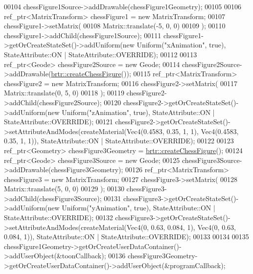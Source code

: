 \begin{DoxyCode}
00104         chessFigure1Source->addDrawable(chessFigure1Geometry);
00105 
00106         ref\_ptr<MatrixTransform> chessFigure1 = \textcolor{keyword}{new} MatrixTransform;
00107         chessFigure1->setMatrix(
00108             Matrix::translate(-5, 0, 0)
00109             );
00110         chessFigure1->addChild(chessFigure1Source);
00111         chessFigure1->getOrCreateStateSet()->addUniform(\textcolor{keyword}{new} Uniform(\textcolor{stringliteral}{"xAnimation"}, \textcolor{keyword}{true}), StateAttribute::ON
       | StateAttribute::OVERRIDE);
00112 
00113         ref\_ptr<Geode> chessFigure2Source = \textcolor{keyword}{new} Geode;
00114         chessFigure2Source->addDrawable(\hyperlink{namespacebrtr_a118d4013732dea1a161b6d225df6dc2e}{brtr::createChessFigure}());
00115         ref\_ptr<MatrixTransform> chessFigure2 = \textcolor{keyword}{new} MatrixTransform;
00116         chessFigure2->setMatrix(
00117             Matrix::translate(0, 5, 0)
00118             );
00119         chessFigure2->addChild(chessFigure2Source);
00120         chessFigure2->getOrCreateStateSet()->addUniform(\textcolor{keyword}{new} Uniform(\textcolor{stringliteral}{"zAnimation"}, \textcolor{keyword}{true}), StateAttribute::ON
       | StateAttribute::OVERRIDE);
00121         chessFigure2->getOrCreateStateSet()->setAttributeAndModes(createMaterial(Vec4(0.4583, 0.35, 1, 1), 
      Vec4(0.4583, 0.35, 1, 1)), StateAttribute::ON | StateAttribute::OVERRIDE);
00122 
00123         ref\_ptr<Geometry> chessFigure3Geometry = \hyperlink{namespacebrtr_a118d4013732dea1a161b6d225df6dc2e}{brtr::createChessFigure}();
00124         ref\_ptr<Geode> chessFigure3Source = \textcolor{keyword}{new} Geode;
00125         chessFigure3Source->addDrawable(chessFigure3Geometry);
00126         ref\_ptr<MatrixTransform> chessFigure3 = \textcolor{keyword}{new} MatrixTransform;
00127         chessFigure3->setMatrix(
00128             Matrix::translate(5, 0, 0)
00129             );
00130         chessFigure3->addChild(chessFigure3Source);
00131         chessFigure3->getOrCreateStateSet()->addUniform(\textcolor{keyword}{new} Uniform(\textcolor{stringliteral}{"yAnimation"}, \textcolor{keyword}{true}), StateAttribute::ON
       | StateAttribute::OVERRIDE);
00132         chessFigure3->getOrCreateStateSet()->setAttributeAndModes(createMaterial(Vec4(0, 0.63, 0.084, 1), 
      Vec4(0, 0.63, 0.084, 1)), StateAttribute::ON | StateAttribute::OVERRIDE);
00133 
00134         
00135         chessFigure1Geometry->getOrCreateUserDataContainer()->addUserObject(&toonCallback);
00136         chessFigure3Geometry->getOrCreateUserDataContainer()->addUserObject(&programCallback);

\end{DoxyCode}
